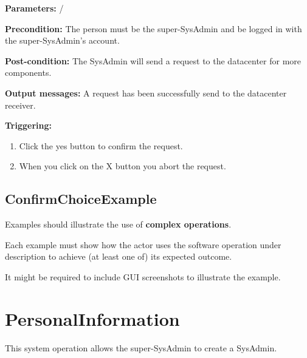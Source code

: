 \begin{description}

\item \textbf{Parameters:} /
\item \textbf{Precondition:} The person must be the super-SysAdmin and be logged
in with the super-SysAdmin's account.
\item \textbf{Post-condition:} The SysAdmin will send a request to the
datacenter for more components.
\item \textbf{Output messages:} A request has been successfully send to the
datacenter receiver.

\item \textbf{Triggering:}
\begin{enumerate}
\item Click the yes button to confirm the request.
\item When you click on the X button you abort the request.
\end{enumerate}

 
\end{description}

\subsection{ConfirmChoiceExample}
Examples should illustrate the use of \textbf{complex operations}.

Each example must show how the actor uses the software operation under
description to achieve (at least one of) its expected outcome.

It might be required to include GUI screenshots to illustrate the example.












\section{PersonalInformation}
\label{operation:PersonalInformation}
This system operation allows the super-SysAdmin to create a SysAdmin.

